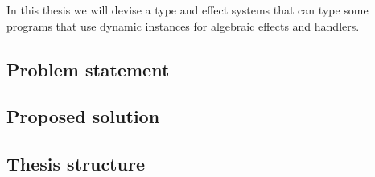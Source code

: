 In this thesis we will devise a type and effect systems that can type some programs that use dynamic instances for algebraic effects and handlers.

\subsection{Problem statement}
\subsection{Proposed solution}
\subsection{Thesis structure}
